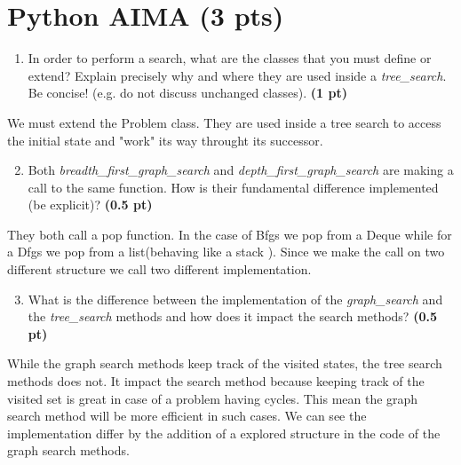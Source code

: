 \documentclass[11pt,a4paper]{../template/report}
\begin{document}
\maketitle

\section{Python AIMA (3 pts)}

\begin{enumerate}
  \item In order to perform a search, what are the classes that you must define or extend? Explain precisely why and where they are used inside a \textit{tree\_search}. Be concise! (e.g. do not discuss unchanged classes). \textbf{(1 pt)}
\end{enumerate}

\begin{answer}
We must extend the Problem class. They are used inside a tree search to access the initial state and "work" its way throught its successor.
\end{answer}



\begin{enumerate}
\setcounter{enumi}{1}
    \item Both \textit{breadth\_first\_graph\_search} and \textit{depth\_first\_graph\_search} are making a call to the same function. How is their fundamental difference implemented (be explicit)? \textbf{(0.5 pt)}
\end{enumerate}

\begin{answer}
They both call a pop function. In the case of Bfgs we pop from a Deque while for a Dfgs we pop from a list(behaving like a stack    ). Since we make the call on two different structure we call two different implementation.
\end{answer}



\begin{enumerate}
\setcounter{enumi}{2}
    \item What is the difference between the implementation of the \textit{graph\_search} and the \textit{tree\_search} methods and how does it impact the search methods? \textbf{(0.5 pt)}
\end{enumerate}

\begin{answer}
While the graph search methods keep track of the visited states, the tree search methods does not. It impact the search method because keeping track of the visited set is great in case of a problem having cycles. This mean the graph search method will be more efficient in such cases. We can see the implementation differ by the addition of a explored structure in the code of the graph search methods.
\end{answer}
\end{document}
